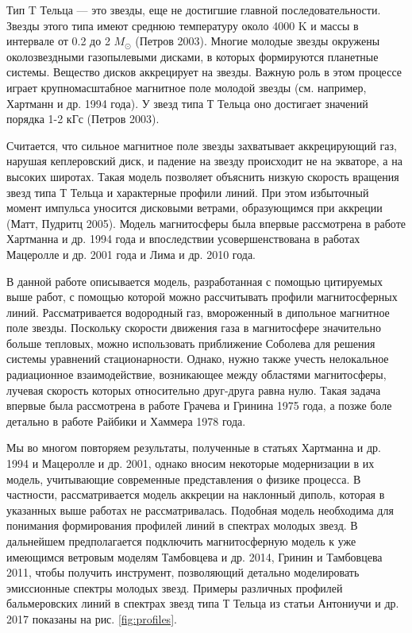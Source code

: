 \documentclass{article}
\begin{document}
Тип T Тельца --- это звезды, еще не достигшие главной последовательности. Звезды этого типа имеют среднюю температуру около 4000 K и массы в интервале от 0.2 до 2 $M_\odot$ (Петров 2003). Многие молодые звезды окружены околозвездными газопылевыми дисками, в которых формируются планетные системы. Вещество дисков аккрецирует на звезды. Важную роль в этом процессе играет крупномасштабное магнитное поле молодой звезды (см. например, Хартманн и др. 1994 года). У звезд типа Т Тельца оно достигает значений порядка 1-2 кГс (Петров 2003).

Считается, что сильное магнитное поле звезды захватывает аккрецирующий газ, нарушая кеплеровский диск, и падение на звезду происходит не на экваторе, а на высоких широтах. Такая модель позволяет объяснить низкую скорость вращения звезд типа Т Тельца и характерные профили линий. При этом избыточный момент импульса уносится дисковыми ветрами, образующимся при аккреции (Матт, Пудритц 2005). Модель магнитосферы была впервые рассмотрена в работе Хартманна и др. 1994 года и впоследствии усовершенствована в работах Мацеролле и др. 2001 года и Лима и др. 2010 года.

В данной работе описывается модель, разработанная с помощью цитируемых выше работ, с помощью которой можно рассчитывать профили магнитосферных линий. Рассматривается водородный газ, вмороженный в дипольное магнитное поле звезды. Поскольку скорости движения газа в магнитосфере значительно больше тепловых, можно использовать приближение Соболева для решения системы уравнений стационарности. Однако, нужно также учесть нелокальное радиационное взаимодействие, возникающее между областями магнитосферы, лучевая скорость которых относительно друг-друга равна нулю. Такая задача впервые была рассмотрена в работе Грачева и Гринина 1975 года, а позже боле детально в работе Райбики и Хаммера 1978 года. 

Мы во многом повторяем результаты, полученные в статьях Хартманна и др. 1994 и Мацеролле и др. 2001, однако вносим некоторые модернизации в их модель, учитывающие современные представления о физике процесса. В частности, рассматривается модель аккреции на наклонный диполь, которая в указанных выше работах не рассматривалась. Подобная модель необходима для понимания формирования профилей линий в спектрах молодых звезд. В дальнейшем предполагается подключить магнитосферную модель к уже имеющимся ветровым моделям Тамбовцева и др. 2014, Гринин и Тамбовцева 2011, чтобы получить инструмент, позволяющий детально моделировать эмиссионные спектры молодых звезд. Примеры различных профилей бальмеровских линий в спектрах звезд типа Т Тельца из статьи Антониучи и др. 2017 показаны на рис. \ref{fig:profiles}.
\end{document}
